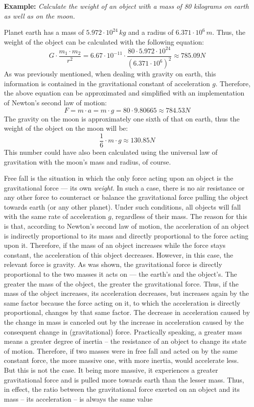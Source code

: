 \textbf{Example: } \emph{Calculate the weight of an object with a mass of 80 kilograms on earth as well as on the moon.}

Planet earth has a mass of $5.972 \cdot 10^24 \,kg$ and a radius of $6.371 \cdot 10^6 \,m$. Thus, the weight of the object can be calculated with the following equation: $$G \cdot \frac{m_1 \cdot m_2}{r^2} =  6.67 \cdot 10^{-11} \cdot \frac{80 \cdot 5.972 \cdot 10^24}{(6.371 \cdot 10^6)^2} \approx 785.09 N$$ As was previously mentioned, when dealing with gravity on earth, this information is contained in the gravitational constant of acceleration $g$. Therefore, the above equation can be approximated and simplified with an implementation of Newton's second law of motion: $$F = m \cdot a = m \cdot g = 80 \cdot 9.80665 \approx 784.53 N$$ The gravity on the moon is approximately one sixth of that on earth, thus the weight of the object on the moon will be: $$\frac{1}{6} \cdot m \cdot g \approx 130.85 N$$ This number could have also been calculated using the universal law of gravitation with the moon's mass and radius, of course. 


Free fall is the situation in which the only force acting upon an object is the gravitational force --- its own \emph{weight}. In such a case, there is no air resistance or any other force to counteract or balance the gravitational force pulling the object towards earth (or any other planet). Under such conditions, all objects will fall with the same rate of acceleration $g$, regardless of their mass. The reason for this is that, according to Newton's second law of motion, the acceleration of an object is indirectly proportional to its mass and directly proportional to the force acting upon it. Therefore, if the mass of an object increases while the force stays constant, the acceleration of this object decreases. However, in this case, the relevant force is gravity. As was shown, the gravitational force is directly proportional to the two masses it acts on --- the earth's and the object's. The greater the mass of the object, the greater the gravitational force. Thus, if the mass of the object increases, its acceleration decreases, but increases again by the same factor because the force acting on it, to which the acceleration is directly proportional, changes by that same factor. The decrease in acceleration caused by the change in mass is canceled out by the increase in acceleration caused by the consequent change in (gravitational) force. Practically speaking, a greater mass means a greater degree of inertia -- the resistance of an object to change its state of motion. Therefore, if two masses were in free fall and acted on by the same constant force, the more massive one, with more inertia, would accelerate less. But this is not the case. It being more massive, it experiences a greater gravitational force and is pulled more towards earth than the lesser mass. Thus, in effect, the ratio between the gravitational force exerted on an object and its mass -- its acceleration -- is always the same value 


